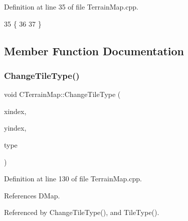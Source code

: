 Definition at line 35 of file Terrain\+Map.\+cpp.


\begin{DoxyCode}
35                          \{
36 
37 \}
\end{DoxyCode}


\subsection{Member Function Documentation}
\hypertarget{classCTerrainMap_a40757d66d7458620a327d6f69a35a2bd}{}\label{classCTerrainMap_a40757d66d7458620a327d6f69a35a2bd} 
\subsubsection{\texorpdfstring{Change\+Tile\+Type()}{ChangeTileType()}\hspace{0.1cm}{\footnotesize\ttfamily [1/2]}}
{\footnotesize\ttfamily void C\+Terrain\+Map\+::\+Change\+Tile\+Type (\begin{DoxyParamCaption}\item[{int}]{xindex,  }\item[{int}]{yindex,  }\item[{\hyperlink{classCTerrainMap_aff2ab991e237269941416dd79d8871d4}{E\+Tile\+Type}}]{type }\end{DoxyParamCaption})}



Definition at line 130 of file Terrain\+Map.\+cpp.



References D\+Map.



Referenced by Change\+Tile\+Type(), and Tile\+Type().


